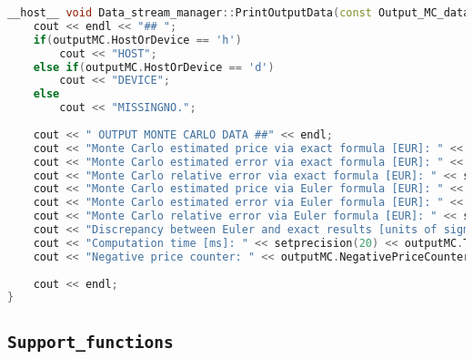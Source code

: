 \begin{lstlisting}[language=C++, caption={\texttt{libraries/CoreLibraries/DataStreamManager/Data\_stream\_manager.cu}}]
__host__ void Data_stream_manager::PrintOutputData(const Output_MC_data& outputMC) const{
	cout << endl << "## ";
	if(outputMC.HostOrDevice == 'h')
		cout << "HOST";
	else if(outputMC.HostOrDevice == 'd')
		cout << "DEVICE";
	else
		cout << "MISSINGNO.";
	
	cout << " OUTPUT MONTE CARLO DATA ##" << endl;
	cout << "Monte Carlo estimated price via exact formula [EUR]: " << setprecision(20) << outputMC.EstimatedPriceMCExact << endl;
	cout << "Monte Carlo estimated error via exact formula [EUR]: " << setprecision(20) << outputMC.ErrorMCExact << endl;
	cout << "Monte Carlo relative error via exact formula [EUR]: " << setprecision(20) << outputMC.GetRelativeErrorExact() << endl;
	cout << "Monte Carlo estimated price via Euler formula [EUR]: " << setprecision(20) << outputMC.EstimatedPriceMCEuler << endl;
	cout << "Monte Carlo estimated error via Euler formula [EUR]: " << setprecision(20) << outputMC.ErrorMCEuler << endl;
	cout << "Monte Carlo relative error via Euler formula [EUR]: " << setprecision(20) << outputMC.GetRelativeErrorEuler() << endl;
	cout << "Discrepancy between Euler and exact results [units of sigma]: " << setprecision(20) << outputMC.GetEulerToExactDiscrepancy() << endl;
	cout << "Computation time [ms]: " << setprecision(20) << outputMC.Tick << endl;
	cout << "Negative price counter: " << outputMC.NegativePriceCounter << endl;
	
	cout << endl;	
}
\end{lstlisting}

\subsection{\texttt{Support\_functions}}
\lipsum[1-3]

